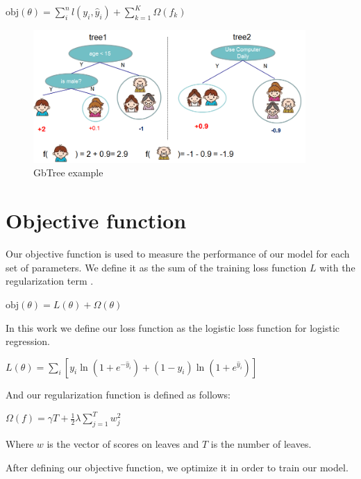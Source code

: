 \documentclass[cic,tc,english]{iiufrgs}
\begin{document}
\(\text{obj}(\theta) = \sum_i^n l(y_i, \hat{y}_i) + \sum_{k=1}^K \Omega(f_k)\)

\begin{figure}
    \caption{GbTree example}
    \begin{center}
        \includegraphics[width=28em]{twocart}
    \end{center}
    \label{fig:ex1}
\end{figure}

\section{Objective function}
Our objective function is used to measure the performance of our model for each set of parameters. We define it as the sum of the training loss function \(L\) with the regularization term \Omega.

\(\text{obj}(\theta) = L(\theta) + \Omega(\theta)\)

In this work we define our loss function as the logistic loss function for logistic regression.

\(L(\theta) = \sum_i[ y_i\ln (1+e^{-\hat{y}_i}) + (1-y_i)\ln (1+e^{\hat{y}_i})]\)

And our regularization function is defined as follows:

\(\Omega(f) = \gamma T + \frac{1}{2}\lambda \sum_{j=1}^T w_j^2\)

Where \(w\) is the vector of scores on leaves and \(T\) is the number of leaves.

After defining our objective function, we optimize it in order to train our model.



\end{document}
